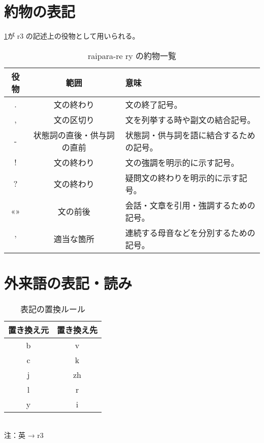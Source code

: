 \section{約物の表記}

\cref{table:list-of-punctuation}が r3 の記述上の役物として用いられる。

\begin{table}[H]
    \centering
    \caption{raipara-re ry の約物一覧}
    \label{table:list-of-punctuation}
    \begin{tabular}{ccl}
        \toprule
        役物 & 範囲 & 意味 \\
        \midrule
        .  & 文の終わり & 文の終了記号。 \\
        ,  & 文の区切り & 文を列挙する時や副文の結合記号。 \\
        -  & 状態詞の直後・供与詞の直前 & 状態詞・供与詞を語に結合するための記号。 \\
        !  & 文の終わり & 文の強調を明示的に示す記号。 \\
        ?  & 文の終わり & 疑問文の終わりを明示的に示す記号。 \\
        «» & 文の前後  & 会話・文章を引用・強調するための記号。 \\
        '  & 適当な箇所 & 連続する母音などを分別するための記号。 \\
        \bottomrule
    \end{tabular}
\end{table}

\section{外来語の表記・読み}

\begin{wraptable}[9]{r}{50mm}
    \centering
    \caption{表記の置換ルール}
    \label{table:r3-rewrite}

    \begin{tabular}{cc}
        \toprule
            置き換え元 & 置き換え先 \\
        \midrule
            b & v \\
            c & k \\
            j & zh \\
            l & r \\
            y & i \\
        \bottomrule
    \end{tabular} \\
    注：英 → r3
\end{wraptable}


